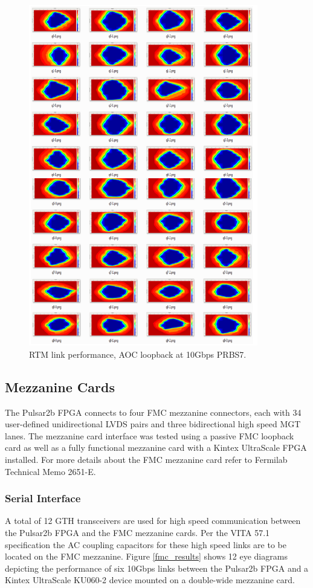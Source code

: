 \documentclass[letterpaper]{article}
\begin{document}
\begin{figure}
\centering
\includegraphics[width=10cm]{rtm_results.png}
\caption{RTM link performance, AOC loopback at 10Gbps PRBS7.}
\label{rtm_results}
\end{figure}

\subsection{Mezzanine Cards}
\label{link_perf_fmc}

The Pulsar2b FPGA connects to four FMC mezzanine connectors, each with 34 user-defined unidirectional LVDS pairs and three bidirectional high speed MGT lanes.  The mezzanine card interface was tested using a passive FMC loopback card as well as a fully functional mezzanine card with a Kintex UltraScale FPGA installed.  For more details about the FMC mezzanine card refer to Fermilab Technical Memo 2651-E\cite{tm2651e}.

\subsubsection{Serial Interface}

A total of 12 GTH transceivers are used for high speed communication between the Pulsar2b FPGA and the FMC mezzanine cards.  Per the VITA 57.1 specification the AC coupling capacitors for these high speed links are to be located on the FMC mezzanine.  Figure \ref{fmc_results} shows 12 eye diagrams depicting the performance of six 10Gbps links between the Pulsar2b FPGA and a Kintex UltraScale KU060-2 device mounted on a double-wide mezzanine card.
\end{document}

